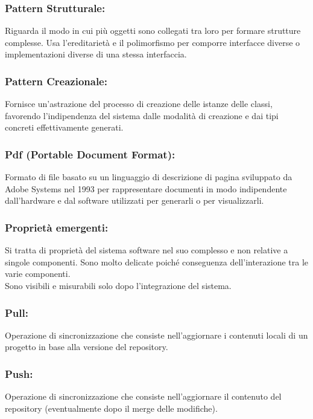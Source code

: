 \subsubsection*{Pattern Strutturale:}
Riguarda il modo in cui pi\`u oggetti sono collegati tra loro per formare
strutture complesse. Usa l'ereditariet\`a e il polimorfismo per comporre
interfacce diverse o implementazioni diverse di una stessa interfaccia.

\subsubsection*{Pattern Creazionale:}
Fornisce un'astrazione del processo di creazione delle
istanze delle classi, favorendo l'indipendenza del sistema dalle modalit\`a di
creazione e dai tipi concreti effettivamente generati.

\subsubsection*{Pdf (Portable Document Format):} Formato di file basato su un
linguaggio di descrizione di pagina sviluppato da Adobe Systems nel 1993 per rappresentare
documenti in modo indipendente dall'hardware e dal software utilizzati per generarli o per visualizzarli.

\subsubsection*{Propriet\`a emergenti:} Si tratta di propriet\`a del sistema
software nel suo complesso e non relative a singole componenti. Sono molto
delicate poich\'e conseguenza dell'interazione tra le varie componenti.\\
Sono visibili e misurabili solo dopo l'integrazione del sistema.

\subsubsection*{Pull:} Operazione di sincronizzazione che consiste
nell'aggiornare i contenuti locali di un progetto in base alla versione del repository.

\subsubsection*{Push:} Operazione di sincronizzazione che consiste
nell'aggiornare il contenuto del repository (eventualmente dopo il merge delle modifiche).


